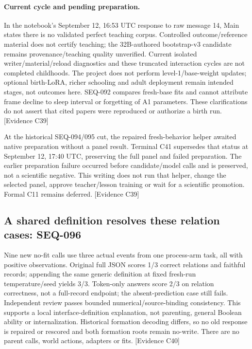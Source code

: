 \documentclass[11pt]{article}
\newcommand{\ev}[1]{\textsf{[Evidence #1]}}
\begin{document}
\paragraph{Current cycle and pending preparation.} In the notebook's September
12, 16:53 UTC response to raw message 14, Main states there is no validated
perfect teaching corpus. Controlled outcome/reference material does not certify
teaching; the 32B-authored bootstrap-v3 candidate remains provenance/teaching
quality unverified. Current isolated writer/material/reload diagnostics and
these truncated interaction cycles are not completed childhoods. The project
does not perform level-1/base-weight updates; optional birth-LoRA, richer
schooling and adult deployment remain intended stages, not outcomes here.
SEQ-092 compares fresh-base fits and cannot attribute frame decline to sleep
interval or forgetting of A1 parameters. These clarifications do not assert
that cited papers were reproduced or authorize a birth run. \ev{C39}

At the historical SEQ-094/095 cut, the repaired fresh-behavior helper awaited
native preparation without a panel result. Terminal C41 supersedes that status
at September 12, 17:40 UTC, preserving the full panel and failed preparation. The
earlier preparation failure occurred before candidate/model calls and is
preserved, not a scientific negative. This writing does not run that helper,
change the selected panel, approve teacher/lesson training or wait for a
scientific promotion. Formal C11 remains deferred. \ev{C39}

\subsection{A shared definition resolves these relation cases: SEQ-096}
Nine new no-fit calls use three actual events from one process-arm task, all
with positive observations. Original full JSON scores 1/3 correct relations
and faithful records; appending the same generic definition at fixed fresh-run
temperature/seed yields 3/3. Token-only answers score 2/3 on relation correctness,
not a full-record endpoint; the absent-prediction case still fails. Independent
review passes bounded numerical/source-binding consistency. This supports a
local interface-definition explanation, not parenting, general Boolean ability
or internalization. Historical formation decoding differs, so no old response
is repaired or rescored and both formation roots remain no-write. There are
no parent calls, world actions, adapters or fits. \ev{C40}
\end{document}
